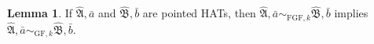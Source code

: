 \documentclass[draft]{scrartcl}
\theoremstyle{definition}
\newtheorem{lemma}[theorem]{Lemma}
\begin{document}


\begin{lemma}
If $\mathfrak{\hat{A}}, \bar{a}$ and $\mathfrak{\hat{B}}, \bar{b}$ are pointed HATs, then $\mathfrak{\hat{A}}, \bar{a} \sim_{\mathrm{FGF},k} \mathfrak{\hat{B}}, \bar{b}$ implies $\mathfrak{\hat{A}}, \bar{a} \sim_{\mathrm{GF},k} \mathfrak{\hat{B}}, \bar{b}$.
\end{lemma}
\end{document}
